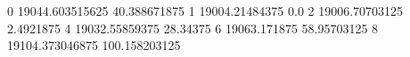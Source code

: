 0 19044.603515625 40.388671875
1 19004.21484375 0.0
2 19006.70703125 2.4921875
4 19032.55859375 28.34375
6 19063.171875 58.95703125
8 19104.373046875 100.158203125
